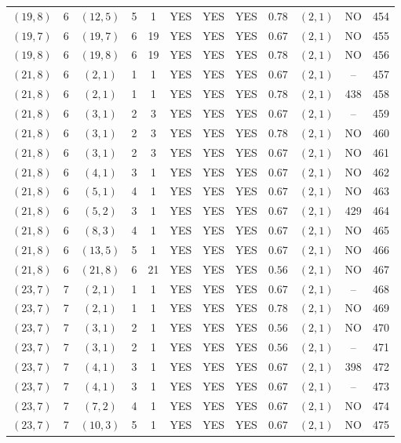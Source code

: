\begin{longtable}{|c|c|c|c|c|c|c|c|c|c|c|c|}
$(19,8)$ & 6 & $(12,5)$ & 5 & 1 & YES & YES & YES & $0.78$ & $(2,1)$ & NO & 454\\
$(19,7)$ & 6 & $(19,7)$ & 6 & 19 & YES & YES & YES & $0.67$ & $(2,1)$ & NO & 455\\
$(19,8)$ & 6 & $(19,8)$ & 6 & 19 & YES & YES & YES & $0.78$ & $(2,1)$ & NO & 456\\
$(21,8)$ & 6 & $(2,1)$ & 1 & 1 & YES & YES & YES & $0.67$ & $(2,1)$ & -- & 457\\
$(21,8)$ & 6 & $(2,1)$ & 1 & 1 & YES & YES & YES & $0.78$ & $(2,1)$ & 438 & 458\\
$(21,8)$ & 6 & $(3,1)$ & 2 & 3 & YES & YES & YES & $0.67$ & $(2,1)$ & -- & 459\\
$(21,8)$ & 6 & $(3,1)$ & 2 & 3 & YES & YES & YES & $0.78$ & $(2,1)$ & NO & 460\\
$(21,8)$ & 6 & $(3,1)$ & 2 & 3 & YES & YES & YES & $0.67$ & $(2,1)$ & NO & 461\\
$(21,8)$ & 6 & $(4,1)$ & 3 & 1 & YES & YES & YES & $0.67$ & $(2,1)$ & NO & 462\\
$(21,8)$ & 6 & $(5,1)$ & 4 & 1 & YES & YES & YES & $0.67$ & $(2,1)$ & NO & 463\\
$(21,8)$ & 6 & $(5,2)$ & 3 & 1 & YES & YES & YES & $0.67$ & $(2,1)$ & 429 & 464\\
$(21,8)$ & 6 & $(8,3)$ & 4 & 1 & YES & YES & YES & $0.67$ & $(2,1)$ & NO & 465\\
$(21,8)$ & 6 & $(13,5)$ & 5 & 1 & YES & YES & YES & $0.67$ & $(2,1)$ & NO & 466\\
$(21,8)$ & 6 & $(21,8)$ & 6 & 21 & YES & YES & YES & $0.56$ & $(2,1)$ & NO & 467\\
$(23,7)$ & 7 & $(2,1)$ & 1 & 1 & YES & YES & YES & $0.67$ & $(2,1)$ & -- & 468\\
$(23,7)$ & 7 & $(2,1)$ & 1 & 1 & YES & YES & YES & $0.78$ & $(2,1)$ & NO & 469\\
$(23,7)$ & 7 & $(3,1)$ & 2 & 1 & YES & YES & YES & $0.56$ & $(2,1)$ & NO & 470\\
$(23,7)$ & 7 & $(3,1)$ & 2 & 1 & YES & YES & YES & $0.56$ & $(2,1)$ & -- & 471\\
$(23,7)$ & 7 & $(4,1)$ & 3 & 1 & YES & YES & YES & $0.67$ & $(2,1)$ & 398 & 472\\
$(23,7)$ & 7 & $(4,1)$ & 3 & 1 & YES & YES & YES & $0.67$ & $(2,1)$ & -- & 473\\
$(23,7)$ & 7 & $(7,2)$ & 4 & 1 & YES & YES & YES & $0.67$ & $(2,1)$ & NO & 474\\
$(23,7)$ & 7 & $(10,3)$ & 5 & 1 & YES & YES & YES & $0.67$ & $(2,1)$ & NO & 475\\

\end{longtable}
